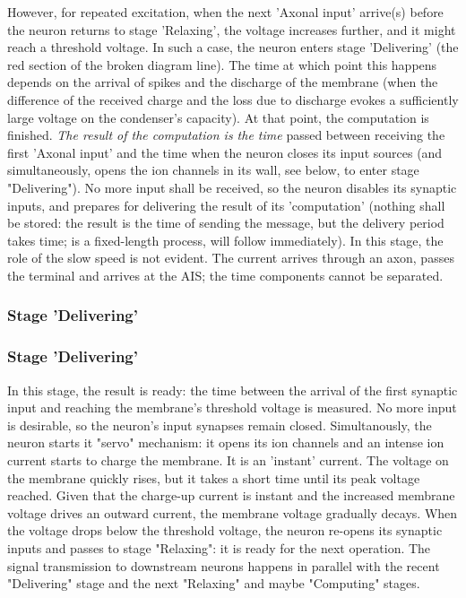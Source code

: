 However, for repeated excitation, when the next 'Axonal input' arrive(s) before
the neuron returns to stage 'Relaxing', the voltage increases further, and it might reach
a threshold voltage. In such a case, the neuron enters stage 'Delivering'
(the red section of the broken diagram line). The time at which point this happens
depends on the arrival of spikes and the discharge of the membrane (when the
difference of the received charge and the loss due to discharge evokes
a sufficiently large voltage on the condenser's capacity). At that point,
the computation is finished. \textit{The result of the computation is
the time} passed between receiving the first 'Axonal input' and the time when
the neuron closes its input sources (and simultaneously, opens the ion channels
in its wall, see below, to enter stage "Delivering").  No more input shall be received, so
the neuron disables its synaptic inputs, and prepares for delivering 
the result of its 'computation' (nothing shall be stored: the result is the time of sending the message, but the delivery period takes time; is a fixed-length
process, will follow immediately). 
In this stage, the role of the slow speed is not evident. The current 
arrives through an axon, passes the terminal and arrives at the AIS;
the time components cannot be separated. 

\fi

\ifx\magyar\undefined


\subsubsection[Delivering]{Stage 'Delivering'\label{sec:Single-OperationDelivering}}

\else


\subsubsection[Delivering]{Stage 'Delivering'\label{sec:Single-OperationDelivering}}

\fi

\ifx\magyar\undefined

In this stage,
the result is ready: the time between the arrival of the first
synaptic input and reaching the membrane's threshold voltage is measured.
No more input is desirable, so the neuron's input synapses remain closed.
Simultanously, the neuron starts it "servo" mechanism: it opens its ion channels
and an intense ion current starts to charge the membrane. 
It is an 'instant' current.
The voltage on the membrane quickly rises, but it takes a short time
until its peak voltage reached.
Given that the charge-up current is instant and the increased
membrane voltage drives an outward current, the membrane voltage
gradually decays.
When the voltage drops below the threshold voltage, the neuron re-opens its synaptic inputs and passes to stage "Relaxing": it is ready for the next operation. The signal transmission to downstream neurons
happens in parallel with the recent "Delivering" stage and
the next "Relaxing" and maybe "Computing" stages. 

